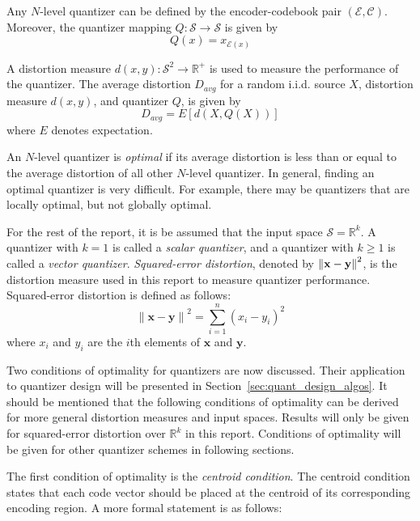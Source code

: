 \documentclass[10pt,twoside,titlepage]{article}
\newcommand{\bx}{\mathbf{x}}
\newcommand{\by}{\mathbf{y}}
\begin{document}
Any $N$-level quantizer can be defined by the encoder-codebook pair $(\mathcal{E}, \mathcal{C})$. Moreover, the quantizer mapping $Q : \mathcal{S} \rightarrow \mathcal{S}$ is given by
\begin{equation*}
Q(x) = x_{\mathcal{E}(x)}
\end{equation*}

A distortion measure $d(x,y) : \mathcal{S}^2 \rightarrow \mathbb{R}^+$ is used to measure the performance of the quantizer. The average distortion $D_{avg}$ for a random i.i.d. source $X$, distortion measure $d(x,y)$, and quantizer $Q$, is given by
\begin{equation}
  \label{eq:D_avg}
D_{avg} = E[d(X,Q(X))]
\end{equation}
where $E$ denotes expectation.

An $N$-level quantizer is \emph{optimal} if its average distortion is less than or equal to the average distortion of all other $N$-level quantizer. In general, finding an optimal quantizer is very difficult. For example, there may be quantizers that are locally optimal, but not globally optimal.

For the rest of the report, it is be assumed that the input space $\mathcal{S}=\mathbb{R}^k$. A quantizer with $k=1$ is called a \emph{scalar quantizer}, and a quantizer with $k \ge 1$ is called a \emph{vector quantizer}. \emph{Squared-error distortion}, denoted by ${\bf {\| x - y \|}}^2$, is the distortion measure used in this report to measure quantizer performance. Squared-error distortion is defined as follows:
\begin{equation*}
{\| \bx - \by \|}^2 = \sum_{i=1}^n{(x_i - y_i)}^2
\end{equation*}
where $x_i$ and $y_i$ are the $i$th elements of $\bx$ and $\by$.

Two conditions of optimality for quantizers are now discussed. Their application to quantizer design will be presented in Section~\ref{sec:quant_design_algos}. It should be mentioned that the following conditions of optimality can be derived for more general distortion measures and input spaces. Results will only be given for squared-error distortion over $\mathbb{R}^k$ in this report. Conditions of optimality will be given for other quantizer schemes in following sections.

The first condition of optimality is the \emph{centroid condition}. The centroid condition states that each code vector should be placed at the centroid of its corresponding encoding region. A more formal statement is as follows:
\end{document}
